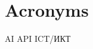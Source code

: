 \documentclass[a4paper,12pt]{report}
\begin{document}
\chapter{Acronyms}
\acs{AI}
\acs{API}
\acs{ICT/ИКТ}
\acronymsChapter
\end{document}
